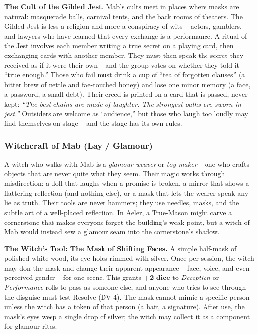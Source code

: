 \textbf{The Cult of the Gilded Jest.} Mab's cults meet in places where masks are natural: masquerade balls, carnival tents, and the back rooms of theaters. The Gilded Jest is less a religion and more a conspiracy of wits -- actors, gamblers, and lawyers who have learned that every exchange is a performance. A ritual of the Jest involves each member writing a true secret on a playing card, then exchanging cards with another member. They must then speak the secret they received as if it were their own -- and the group votes on whether they told it ``true enough.'' Those who fail must drink a cup of ``tea of forgotten clauses'' (a bitter brew of nettle and fae-touched honey) and lose one minor memory (a face, a password, a small debt). Their creed is printed on a card that is passed, never kept: \textit{``The best chains are made of laughter. The strongest oaths are sworn in jest.''} Outsiders are welcome as ``audience,'' but those who laugh too loudly may find themselves on stage -- and the stage has its own rules.

\subsubsection*{Witchcraft of Mab (Lay / Glamour)}

A witch who walks with Mab is a \textit{glamour-weaver} or \textit{toy-maker} -- one who crafts objects that are never quite what they seem. Their magic works through misdirection: a doll that laughs when a promise is broken, a mirror that shows a flattering reflection (and nothing else), or a mask that lets the wearer speak any lie as truth. Their tools are never hammers; they use needles, masks, and the subtle art of a well-placed reflection. In Aeler, a True-Mason might carve a cornerstone that makes everyone forget the building's weak point, but a witch of Mab would instead sew a glamour seam into the cornerstone's shadow.

\textbf{The Witch's Tool: The Mask of Shifting Faces.} A simple half-mask of polished white wood, its eye holes rimmed with silver. Once per session, the witch may don the mask and change their apparent appearance -- face, voice, and even perceived gender -- for one scene. This grants \textbf{+2 dice} to \textit{Deception} or \textit{Performance} rolls to pass as someone else, and anyone who tries to see through the disguise must test Resolve (DV 4). The mask cannot mimic a specific person unless the witch has a token of that person (a hair, a signature). After use, the mask's eyes weep a single drop of silver; the witch may collect it as a component for glamour rites.

